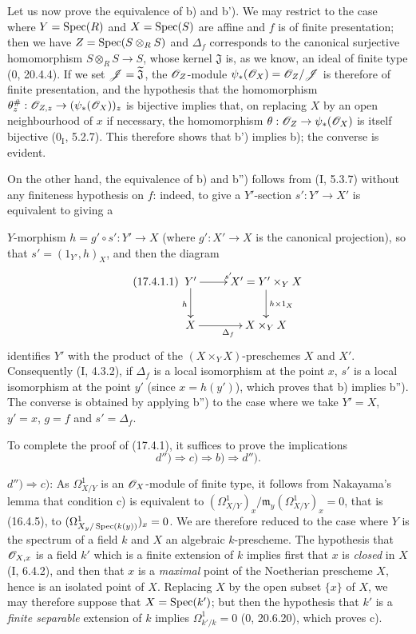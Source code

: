 Let us now prove the equivalence of b) and b'). We may restrict to the case where $Y=\operatorname{Spec}(R)$ and $X=\operatorname{Spec}(S)$ are affine and $f$ is of finite presentation; then we have $Z=\operatorname{Spec}(S\otimes_R S)$ and $\Delta_f$ corresponds to the canonical surjective homomorphism $S\otimes_R S\to S$, whose kernel $\mathfrak{J}$ is, as we know, an ideal of finite type (0, 20.4.4). If we set $\mathscr{J}=\widetilde{\mathfrak{J}}$, the $\mathscr{O}_Z$-module $\psi_*(\mathscr{O}_X)=\mathscr{O}_Z/\mathscr{J}$ is therefore of finite presentation, and the hypothesis that the homomorphism $\theta_z^\#: \mathscr{O}_{Z,z}\to(\psi_*(\mathscr{O}_X))_z$ is bijective implies that, on replacing $X$ by an open neighbourhood of $x$ if necessary, the homomorphism $\theta:\mathscr{O}_Z\to\psi_*(\mathscr{O}_X)$ is itself bijective ($0_{\mathrm I}$, 5.2.7). This therefore shows that b') implies b); the converse is evident.

On the other hand, the equivalence of b) and b'') follows from (I, 5.3.7) without any finiteness hypothesis on $f$: indeed, to give a $Y'$-section $s':Y'\to X'$ is equivalent to giving a

$Y$-morphism $h=g'\circ s':Y'\to X$ (where $g':X'\to X$ is the canonical projection), so that $s'=(1_{Y'},h)_X$, and then the diagram
\[
\tag{17.4.1.1}
\label{IV.17.4.1.1}
\xymatrix{
Y' \ar[r]^{s'} \ar[d]_h & X'=Y'\times_Y X \ar[d]^{h\times 1_X}\\
X \ar[r]_{\Delta_f} & X\times_Y X
}
\]
identifies $Y'$ with the product of the $(X\times_Y X)$-preschemes $X$ and $X'$. Consequently (I, 4.3.2), if $\Delta_f$ is a local isomorphism at the point $x$, $s'$ is a local isomorphism at the point $y'$ (since $x=h(y')$), which proves that b) implies b''). The converse is obtained by applying b'') to the case where we take $Y'=X$, $y'=x$, $g=f$ and $s'=\Delta_f$.

To complete the proof of (17.4.1), it suffices to prove the implications
\[
d'')\Rightarrow c)\Rightarrow b)\Rightarrow d'').
\]

$d'')\Rightarrow c)$: As $\Omega^1_{X/Y}$ is an $\mathscr{O}_X$-module of finite type, it follows from Nakayama's lemma that condition c) is equivalent to $(\Omega^1_{X/Y})_x/\mathfrak{m}_y(\Omega^1_{X/Y})_x=0$, that is (16.4.5), to $(\Omega^1_{X_y/\operatorname{Spec}(k(y))})_x=0$. We are therefore reduced to the case where $Y$ is the spectrum of a field $k$ and $X$ an algebraic $k$-prescheme. The hypothesis that $\mathscr{O}_{X,x}$ is a field $k'$ which is a finite extension of $k$ implies first that $x$ is \emph{closed} in $X$ (I, 6.4.2), and then that $x$ is a \emph{maximal} point of the Noetherian prescheme $X$, hence is an isolated point of $X$. Replacing $X$ by the open subset $\{x\}$ of $X$, we may therefore suppose that $X=\operatorname{Spec}(k')$; but then the hypothesis that $k'$ is a \emph{finite separable} extension of $k$ implies $\Omega^1_{k'/k}=0$ (0, 20.6.20), which proves c).

